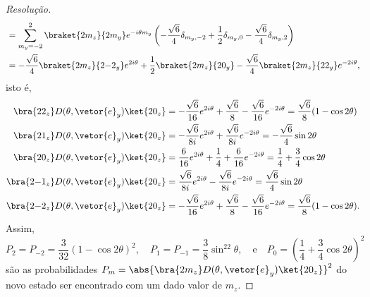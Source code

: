 \begin{proof}[Resolução]
\begin{align*}
                                                   &= \sum_{m_y = -2}^{2} \braket{2m_z}{2m_y} e^{-i\theta m_y} \left(-\frac{\sqrt{6}}{4} \delta_{m_y, -2} + \frac12 \delta_{m_y,0}- \frac{\sqrt{6}}{4} \delta_{m_y, 2}\right)\\
                                                   &=- \frac{\sqrt{6}}{4}\braket{2m_z}{2{-2}_y} e^{2i\theta} + \frac12 \braket{2m_z}{20_y} - \frac{\sqrt{6}}{4} \braket{2m_z}{22_y} e^{-2i\theta},
    \end{align*}
    isto é,
    \begin{align*}
        \bra{22_z}D(\theta,\vetor{e}_y) \ket{20_z} &= -\frac{\sqrt{6}}{16} e^{2i \theta} + \frac{\sqrt{6}}{8} - \frac{\sqrt{6}}{16} e^{-2i\theta} = \frac{\sqrt{6}}{8} (1 - \cos2\theta)\\
        \bra{21_z}D(\theta,\vetor{e}_y) \ket{20_z} &= -\frac{\sqrt{6}}{8i} e^{2i\theta} + \frac{\sqrt{6}}{8i} e^{-2i\theta} = -\frac{\sqrt{6}}{4}\sin2\theta\\
        \bra{20_z}D(\theta,\vetor{e}_y) \ket{20_z} &= \frac{6}{16}e^{2i\theta} + \frac14 + \frac{6}{16} e^{-2i\theta} = \frac14 + \frac{3}{4}\cos2\theta\\
        \bra{2{-1}_z}D(\theta,\vetor{e}_y) \ket{20_z} &= \frac{\sqrt{6}}{8i}e^{2i\theta} - \frac{\sqrt{6}}{8i} e^{-2i\theta} = \frac{\sqrt{6}}{4} \sin2\theta\\
        \bra{2{-2}_z}D(\theta,\vetor{e}_y) \ket{20_z} &= - \frac{\sqrt{6}}{16} e^{2i\theta} + \frac{\sqrt{6}}{8} - \frac{\sqrt{6}}{16} e^{-2i\theta} = \frac{\sqrt{6}}{8} (1 - \cos2\theta).
    \end{align*}
    Assim, 
    \begin{equation*}
        P_2 = P_{-2} = \frac{3}{32} (1 - \cos 2\theta)^2,\quad
        P_1 = P_{-1} = \frac{3}{8} \sin^22\theta,\quad\text{e}\quad
        P_0 = \left(\frac14 + \frac34 \cos2\theta\right)^2
    \end{equation*}
    são as probabilidades \(P_m = \abs{\bra{2m_z} D(\theta, \vetor{e}_y) \ket{20_z}}^2\) do novo estado ser encontrado com um dado valor de \(m_z.\)
\end{proof}
